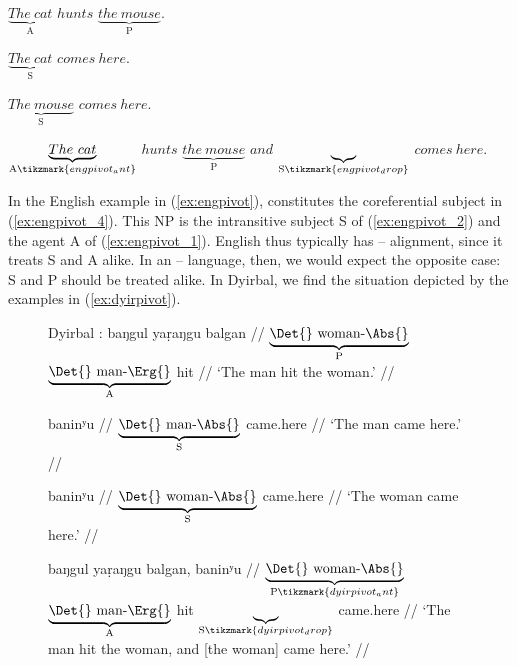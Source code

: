 \pex[belowexskip=1.75em]\label{ex:engpivot}%
	\a\label{ex:engpivot_1}%
		$\underbrace{The\ cat}_{\text{A}}$ 
		$hunts$ $\underbrace{the\ mouse}_{\text{P}}$.
	
	\a\label{ex:engpivot_2}%
		$\underbrace{The\ cat}_{\text{S}}$ $comes\ here.$
	
	\a\label{ex:engpivot_3}%
		$\underbrace{The\ mouse}_{\text{S}}$ $comes\ here.$
	
	\a\label{ex:engpivot_4}%
		$\underbrace{The\ cat}_{\text{A}\tikzmark{engpivot_ant}}$
		$hunts$
		$\underbrace{the\ mouse}_{\text{P}}$
		$and$
		$\underbrace{ }_{\text{S}\tikzmark{engpivot_drop}}$
		$comes\ here.$

\xe

In the English example in (\ref{ex:engpivot}),  constitutes the
coreferential subject in (\ref{ex:engpivot_4}). This NP is the intransitive
subject S of (\ref{ex:engpivot_2}) and the agent A of (\ref{ex:engpivot_1}).
English thus typically has \Nom{}--\Acc{} alignment, since it treats S and A
alike. In an \Erg{}--\Abs{} language, then, we would expect the opposite case:
S and P should be treated alike. In Dyirbal, we find the situation depicted by
the examples in (\ref{ex:dyirpivot}).

\begin{figure}
\pex\label{ex:dyirpivot}%
Dyirbal \parencite[adapted from][112]{comrie1989}:
\a\label{ex:dyirpivot_1}
	\begingl
		 {baŋgul yaṛaŋgu} balgan //
		\glb $\underbrace{\text{\Det{} woman-\Abs{}}}_{\text{P}}$
			$\underbrace{\text{\Det{} man-\Erg{}}}_{\text{A}}$ hit //
		\glft `The man hit the woman.' //
	\endgl
	
\a\label{ex:dyirpivot_2}%
	\begingl
		 baninʸu //
		\glb $\underbrace{\text{\Det{} man-\Abs{}}}_{\text{S}}$ came.here //
		\glft `The man came here.' //
	\endgl
	
\a\label{ex:dyirpivot_3}%
	\begingl
		 baninʸu //
		\glb $\underbrace{\text{\Det{} woman-\Abs{}}}_{\text{S}}$ 
			came.here //
		\glft `The woman came here.' //
	\endgl
	
\a\label{ex:dyirpivot_4}%
	\begingl[aboveglftskip=1.75em]
		 {baŋgul yaṛaŋgu} balgan, {} baninʸu //
		\glb $\underbrace{\text{\Det{} woman-\Abs{}}}_%
				{\text{P}\tikzmark{dyirpivot_ant}}$
			$\underbrace{\text{\Det{} man-\Erg{}}}_{\text{A}}$
			hit 
			$\underbrace{ }_{\text{S}\tikzmark{dyirpivot_drop}}$
			came.here //
		\glft `The man hit the woman, and [the woman] came here.' //
	\endgl

\xe
\end{figure}

